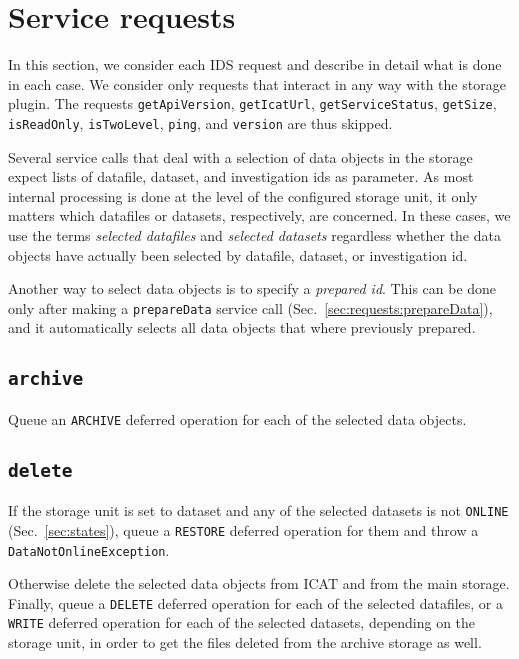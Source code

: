 \documentclass[paper=a4]{scrartcl}
\begin{document}
\section{Service requests}
\label{sec:requests}

In this section, we consider each IDS request and describe in detail
what is done in each case.  We consider only requests that interact in
any way with the storage plugin.  The requests \texttt{getApiVersion},
\texttt{getIcatUrl}, \texttt{getServiceStatus}, \texttt{getSize},
\texttt{isReadOnly}, \texttt{isTwoLevel}, \texttt{ping}, and
\texttt{version} are thus skipped.

Several service calls that deal with a selection of data objects in
the storage expect lists of datafile, dataset, and investigation ids
as parameter.  As most internal processing is done at the level of the
configured storage unit, it only matters which datafiles or datasets,
respectively, are concerned.  In these cases, we use the terms
\emph{selected datafiles} and \emph{selected datasets} regardless
whether the data objects have actually been selected by datafile,
dataset, or investigation id.

Another way to select data objects is to specify a
\emph{prepared id}.  This can be done only after making a
\texttt{prepareData} service call
(Sec.~\ref{sec:requests:prepareData}), and it automatically
selects all data objects that where previously prepared.

\subsection{\texttt{archive}}

Queue an \texttt{ARCHIVE} deferred operation for each of the selected
data objects.

\subsection{\texttt{delete}}
\label{sec:requests:delete}

If the storage unit is set to dataset and any of the selected
datasets is not \texttt{ONLINE} (Sec.~\ref{sec:states}), queue a
\texttt{RESTORE} deferred operation for them and throw a
\texttt{DataNotOnlineException}.

Otherwise delete the selected data objects from ICAT and from the main
storage.  Finally, queue a \texttt{DELETE} deferred operation for each
of the selected datafiles, or a \texttt{WRITE} deferred operation for
each of the selected datasets, depending on the storage unit, in order
to get the files deleted from the archive storage as well.
\end{document}
